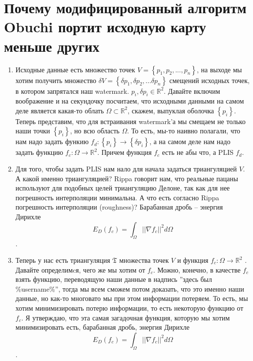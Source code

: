 \documentclass{article}
\begin{document}
\section{Почему модифицированный алгоритм Obuchi портит исходную карту меньше других}
\begin{enumerate}
    \label{intro}
    \item Исходные данные есть множество точек $V = \left\{p_1, p_2, ... , p_n\right\}$, на выходе мы хотим получить множество 
    $\delta V = \left\{\delta {p_1}, \delta{p_2}, ... \delta{p_n} \right\}$ смещений исходных точек, 
    в котором запрятался наш watermark. $p_i, \delta{p_i} \in \mathbb{R}^2$. 
    Давайте включим воображение и на секундочку посчитаем, что исходными данными на самом деле является какая-то облать $\Omega \subset \mathbb{R}^2$,
    скажем, выпуклая оболочка $\left\{p_i\right\}$. Теперь представим, что для встраивания watermark'а мы смещаем не только наши точки $\left\{p_i\right\}$, 
    но всю область $\Omega$. То есть, мы-то наивно полагали, что нам надо задать функию $f_d: \left\{p_i\right\} \to \left\{\delta p_i \right\}$, 
    а на самом деле нам надо задать функцию $f_c: \Omega \to \mathbb{R}^2$. Причем функция $f_c$ есть не абы что, а PLIS $f_d$.
    
    \item Для того, чтобы задать PLIS нам нало для начала задаться триангуляцией $V$. А какой именно триангуляцией? 
    Rippa говорит нам, что реальные пацаны используют для подобных целей триангуляцию Делоне, так как для нее погрешность интерполяции минимальна. 
    А что есть согласно Rippa погрешность интерполяции (roughness)? Барабанная дробь -- энергия Дирихле $$E_D(f_c) = \int_{\Omega}{||{\nabla{f_c}}||^2 d\Omega}$$.
    
    \item \label{Criterion}
    Теперь у нас есть триангуляция $\mathfrak{T}$ множества точек $V$ и функция $f_c: \Omega \to \mathbb{R}^2$ . Давайте определимcя, чего же мы хотим от $f_c$.
    Можно, конечно, в качестве $f_c$ взять функцию, переводящую наши данные в надпись ''здесь был \%username\%'', тогда мы всем сможем потом доказать, 
    что это именно наши данные, но как-то многовато мы при этом информации потеряем. То есть, мы хотим минимизировать потерю информации, 
    то есть некоторую функцию от $f_c$. Я утверждаю, что эта самая загадочная функция, которую мы хотим минимизировать есть, барабанная дробь,
    энергия Дирихле $$E_D(f_c) = \int_{\Omega}{||{\nabla{f_c}}||^2 d\Omega}$$.
    

\end{enumerate}
\end{document}
